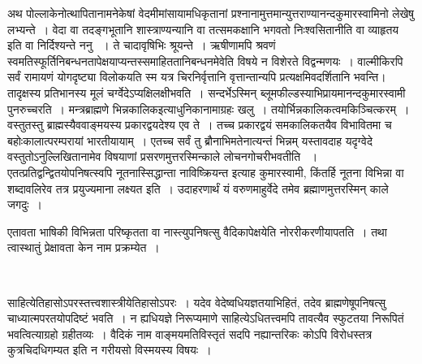 अथ पोल्लाकेनोत्थापितानामनेकेषां वेदमीमांसायामधिकृतानां प्रश्नानामुत्तमान्युत्तराण्यानन्दकुमारस्वामिनो  लेखेषु लभ्यन्ते~। वेदा वा तदङ्गभूतानि शास्त्राण्यन्यानि वा तत्समकक्षानि भगवतो निःश्वसितानीति वा व्याहृतय इति वा निर्दिश्यन्ते ननु ~। ते चादावृषिभिः श्रूयन्ते~। ऋषीणामपि श्रवणं स्वमतिस्फूर्तिनिबन्धनतापेक्षयाप्यन्तस्समाहिततानिबन्धनमेवेति विषये न विशेरते विद्वन्मणयः~। वाल्मीकिरपि सर्वं रामायणं योगदृष्ट्या विलोकयति स्म यत्र चिरनिर्वृत्तानि वृत्तान्तान्यपि प्रत्यक्षमिव\break दर्शितानि भवन्ति। तादृक्षस्य प्रतिभानस्य मूलं चर्ग्वेदेऽप्यक्षिलक्षीभवति~। सन्दर्भेऽस्मिन् ब्लूम\-फील्डस्याभिप्रायमानन्दकुमारस्वामी पुनरुच्चरति~। मन्त्रब्राह्मणे भिन्नकालिक\break इत्याधुनिकानामाग्रहः खलु~। तयोर्भिन्नकालिकत्वमकिञ्चित्करम्~। वस्तुतस्तु \hbox{ब्राह्म\-स्यैव}\break वाङ्मयस्य प्रकारद्वयदेश्य एव ते~। तच्च प्रकारद्वयं समकालिकतयैव विभावितमा च बहोः\break कालात्परम्परायां भारतीयायाम्~। एतच्च सर्वं तु ब्रौनाभिमतेनात्यन्तं भिन्नम्  यस्तावदाह यदृग्वेदे वस्तुतोऽनुल्लिखितानामेव विषयाणां प्रसरणमुत्तरस्मिन्काले लोचनगोचरीभवतीति ~। एतत्प्रतिद्वन्द्वितयोपनिषत्स्वपि नूतनास्सिद्धान्ता नाविष्क्रियन्त इत्याह कुमारस्वामी, किंतर्हि नूतना विभिन्ना वा शब्दावलिरेव तत्र प्रयुज्यमाना लक्ष्यत इति~। उदाहरणार्थं यं वरुणमाहुर्वेदे तमेव ब्रह्माणमुत्तरस्मिन् काले जगदुः~।

एतावता भाषिकी विभिन्नता परिष्कृतता वा नास्त्युपनिषत्सु वैदिकापेक्षयेति नोररीकरणीयापतति~। तथा त्वास्थातुं प्रेक्षावता केन नाम प्रक्रम्येत~।

\begin{myquote}

~\hfill {}
\end{myquote}

साहित्येतिहासोऽपरस्तत्त्वशास्त्रीयेतिहासोऽपरः~। यदेव वेदेष्वधियज्ञतयाभिहितं, तदेव ब्राह्मणेषूपनिषत्सु चाध्यात्मपरतयोपदिष्टं भवति~। न ह्यधियज्ञे निरूप्यमाणे साहित्येऽधितत्त्वमपि तावत्यैव स्फुटतया निरूपितं भवत्वित्याग्रहो ग्रहीतव्यः~। वैदिकं नाम वाङ्मयमतिविस्तृतं सदपि नह्यान्तरिकः कोऽपि विरोधस्तत्र कुत्रचिदधिगम्यत इति न गरीयसो विस्मयस्य विषयः~।

